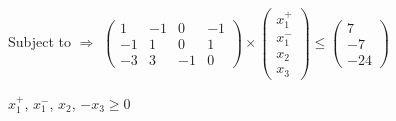 \documentclass[letterpaper,11pt]{article}
\begin{document}
Subject to $\Rightarrow$
$
    \begin{pmatrix}
        1 & -1 & 0 & -1\\ 
        -1 & 1 & 0 & 1\\
        -3 & 3 & -1 & 0
    \end{pmatrix}
    \times
    \begin{pmatrix}
        x_1^{+}\\
        x_1^{-}\\
        x_2\\
        x_3
    \end{pmatrix}
    \leq
    \begin{pmatrix}
        7\\ 
        -7\\
        -24
    \end{pmatrix}
$

\tabto{63pt} $x_1^{+}$, $x_1^{-}$, $x_2$, $-x_3 \geq 0$
\end{document}

